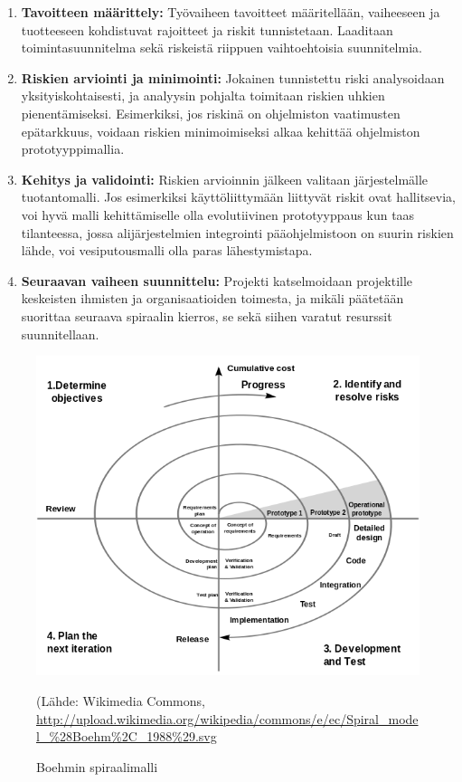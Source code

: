 \documentclass[finnish,12pt]{tktltiki2}
\theoremstyle{definition}
\theoremstyle{remark}
\begin{document}
\begin{enumerate}
\item \textbf{Tavoitteen määrittely:} Työvaiheen tavoitteet määritellään, vaiheeseen ja tuotteeseen kohdistuvat rajoitteet ja riskit tunnistetaan. Laaditaan toimintasuunnitelma sekä riskeistä riippuen vaihtoehtoisia suunnitelmia.
\item \textbf{Riskien arviointi ja minimointi:} Jokainen tunnistettu riski analysoidaan yksityiskohtaisesti, ja analyysin pohjalta toimitaan riskien uhkien pienentämiseksi. Esimerkiksi, jos riskinä on ohjelmiston vaatimusten epätarkkuus, voidaan riskien minimoimiseksi alkaa kehittää ohjelmiston prototyyppimallia. 
\item \textbf{Kehitys ja validointi:} Riskien arvioinnin jälkeen valitaan järjestelmälle tuotantomalli. Jos esimerkiksi käyttöliittymään liittyvät riskit ovat hallitsevia, voi hyvä malli kehittämiselle olla evolutiivinen prototyyppaus kun taas tilanteessa, jossa alijärjestelmien integrointi pääohjelmistoon on suurin riskien lähde, voi vesiputousmalli olla paras lähestymistapa.
\item \textbf{Seuraavan vaiheen suunnittelu: } Projekti katselmoidaan projektille keskeisten ihmisten ja organisaatioiden toimesta, ja mikäli päätetään suorittaa seuraava spiraalin kierros, se sekä siihen varatut resurssit suunnitellaan.
\end{enumerate}

\begin{figure}[ht!]
\centering
{}
\includegraphics[width=150mm]{spiral.png}
\caption{Boehmin spiraalimalli}
(Lähde: Wikimedia Commons, \url{http://upload.wikimedia.org/wikipedia/commons/e/ec/Spiral_model_%28Boehm%2C_1988%29.svg} 
\label{overflow}
\end{figure}
\end{document}
